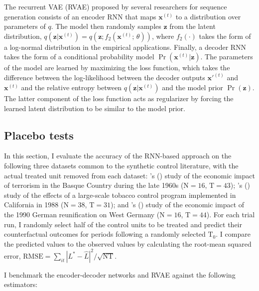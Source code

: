 \documentclass[hidelinks,12pt]{article}
\newcommand{\possessivecite}[1]{\citeauthor{#1}'s (\citeyear{#1})}
\begin{document}
The recurrent VAE (RVAE) proposed by several researchers \citep{fabius2014variational, chung2015recurrent,bowman2015generating} for sequence generation consists of an encoder RNN that maps $\boldsymbol{x}^{(t)}$ to a distribution over parameters of $q$. The model then randomly samples $\boldsymbol{z}$ from the latent distribution, $q(\boldsymbol{z} | \boldsymbol{x}^{(t)}) = q (\boldsymbol{z}; f_2(\boldsymbol{x}^{(t)};\, \theta))$, where $f_2(\cdot)$ takes the form of a log-normal distribution in the empirical applications. Finally, a decoder RNN takes the form of a conditional probability model $\Pr (\boldsymbol{x}^{(t)} | \boldsymbol{z})$. The parameters of the model are learned by maximizing the loss function, which takes the difference between the log-likelihood between the decoder outputs $\boldsymbol{x'}^{(t)}$ and $\boldsymbol{x}^{(t)}$ and the relative entropy between  $q(\boldsymbol{z} | \boldsymbol{x}^{(t)})$ and the model prior $\Pr (\boldsymbol{z})$. The latter component of the loss function acts as regularizer by forcing the learned latent distribution to be similar to the model prior. 

\subsection{Placebo tests} \label{placebo}

In this section, I evaluate the accuracy of the RNN-based approach on the following three datasets common to the synthetic control literature, with the actual treated unit removed from each dataset: \possessivecite{abadie2003economic} study of the economic impact of terrorism in the Basque Country during the late 1960s ($\text{N}=16$, $\text{T}=43$); \possessivecite{abadie2010synthetic} study of the effects of a large-scale tobacco control program implemented in California in 1988 ($\text{N}=38$, $\text{T}=31$); and \possessivecite{abadie2015comparative} study of the economic impact of the 1990 German reunification on West Germany ($\text{N}=16$, $\text{T}=44$). For each trial run, I randomly select half of the control units to be treated and predict their counterfactual outcomes for periods following a randomly selected $\text{T}_0$. I compare the predicted values to the observed values by calculating the root-mean squared error, $\text{RMSE} = \sum_{it}|L^{*} -\hat{L}|^2 / \sqrt{\text{NT}}$. 

I benchmark the encoder-decoder networks and RVAE against the following estimators:
\end{document}
